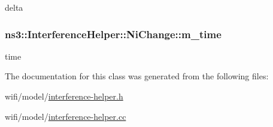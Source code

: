 delta 

\subsubsection[{\texorpdfstring{m\+\_\+time}{m_time}}]{ ns3\+::\+Interference\+Helper\+::\+Ni\+Change\+::m\+\_\+time\hspace{0.3cm}{\ttfamily [private]}}\hypertarget{classns3_1_1InterferenceHelper_1_1NiChange_aaaca554e6b585a7a0bfe7ff17a4702d8}{}\label{classns3_1_1InterferenceHelper_1_1NiChange_aaaca554e6b585a7a0bfe7ff17a4702d8}


time 



The documentation for this class was generated from the following files\+:\begin{DoxyCompactItemize}
\item 
wifi/model/\hyperlink{interference-helper_8h}{interference-\/helper.\+h}\item 
wifi/model/\hyperlink{interference-helper_8cc}{interference-\/helper.\+cc}\end{DoxyCompactItemize}

